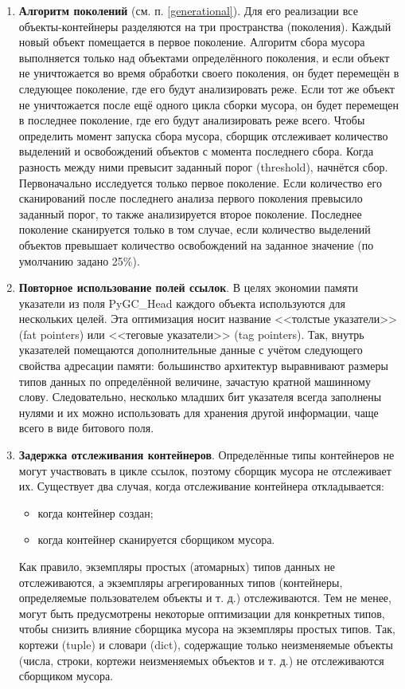 \begin{enumerate}[label*=\arabic*.]
	\item \textbf{Алгоритм поколений} (см. п. \ref{generational}). Для его реализации все объекты-контейнеры разделяются на три пространства (поколения). Каждый новый объект помещается в первое поколение. Алгоритм сбора мусора выполняется только над объектами определённого поколения, и если объект не уничтожается во время обработки своего поколения, он будет перемещён в следующее поколение, где его будут анализировать реже. Если тот же объект не уничтожается после ещё одного цикла сборки мусора, он будет перемещен в последнее поколение, где его будут анализировать реже всего. Чтобы определить момент запуска сбора мусора, сборщик отслеживает количество выделений и освобождений объектов с момента последнего сбора. Когда разность между ними превысит заданный порог (threshold), начнётся сбор. Первоначально исследуется только первое поколение. Если количество его сканирований после последнего анализа первого поколения превысило заданный порог, то также анализируется второе поколение. Последнее поколение сканируется только в том случае, если количество выделений объектов превышает количество освобождений на заданное значение (по умолчанию задано 25\%). \cite{python_gc}
	
	\item \textbf{Повторное использование полей ссылок}. В целях экономии памяти указатели из поля PyGC\_Head каждого объекта используются для нескольких целей. Эта оптимизация носит название <<толстые указатели>> (fat pointers) или <<теговые указатели>> (tag pointers). Так, внутрь указателей помещаются дополнительные данные с учётом следующего свойства адресации памяти: большинство архитектур выравнивают размеры типов данных по определённой величине, зачастую кратной машинному слову. Следовательно, несколько младших бит указателя всегда заполнены нулями и их можно использовать для хранения другой информации, чаще всего в виде битового поля. \cite{python_gc}
	
	\item \textbf{Задержка отслеживания контейнеров}. Определённые типы контейнеров не могут участвовать в цикле ссылок, поэтому сборщик мусора не отслеживает их. Существует два случая, когда отслеживание контейнера откладывается:
	\begin{itemize}[label*=---]
		\item когда контейнер создан;
		\item когда контейнер сканируется сборщиком мусора.
	\end{itemize}
	Как правило, экземпляры простых (атомарных) типов данных не отслеживаются, а экземпляры агрегированных типов (контейнеры, определяемые пользователем объекты и т. д.) отслеживаются. Тем не менее, могут быть предусмотрены некоторые оптимизации для конкретных типов, чтобы снизить влияние сборщика мусора на экземпляры простых типов. Так, кортежи (tuple) и словари (dict), содержащие только неизменяемые объекты (числа, строки, кортежи неизменяемых объектов и т. д.) не отслеживаются сборщиком мусора. \cite{python_gc}
\end{enumerate}

